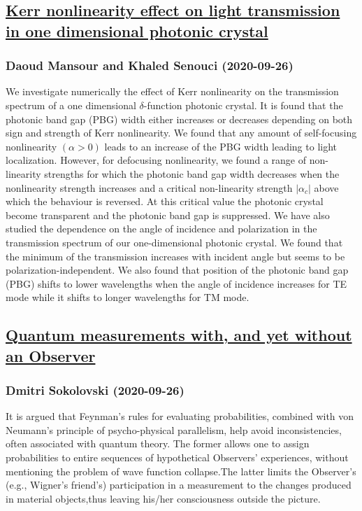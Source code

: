 \subsection*{\href{http://arxiv.org/abs/2009.12572v2}{Kerr nonlinearity effect on light transmission in one dimensional  photonic crystal}}
\subsubsection*{Daoud Mansour and Khaled Senouci (2020-09-26)}
We investigate numerically the effect of Kerr nonlinearity on the
transmission spectrum of a one dimensional $\delta$-function photonic crystal.
It is found that the photonic band gap (PBG) width either increases or
decreases depending on both sign and strength of Kerr nonlinearity. We found
that any amount of self-focusing nonlinearity $(\alpha >0)$ leads to an
increase of the PBG width leading to light localization. However, for
defocusing nonlinearity, we found a range of non-linearity strengths for which
the photonic band gap width decreases when the nonlinearity strength increases
and a critical non-linearity strength $|\alpha_{c}|$ above which the behaviour
is reversed. At this critical value the photonic crystal become transparent and
the photonic band gap is suppressed. We have also studied the dependence on the
angle of incidence and polarization in the transmission spectrum of our
one-dimensional photonic crystal. We found that the minimum of the transmission
increases with incident angle but seems to be polarization-independent. We also
found that position of the photonic band gap (PBG) shifts to lower wavelengths
when the angle of incidence increases for TE mode while it shifts to longer
wavelengths for TM mode.

\subsection*{\href{http://arxiv.org/abs/2009.12568v1}{Quantum measurements with, and yet without an Observer}}
\subsubsection*{Dmitri Sokolovski (2020-09-26)}
It is argued that Feynman's rules for evaluating probabilities, combined with
von Neumann's principle of psycho-physical parallelism, help avoid
inconsistencies, often associated with quantum theory. The former allows one to
assign probabilities to entire sequences of hypothetical Observers'
experiences, without mentioning the problem of wave function collapse.The
latter limits the Observer's (e.g., Wigner's friend's) participation in a
measurement to the changes produced in material objects,thus leaving his/her
consciousness outside the picture.

